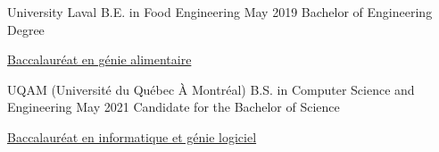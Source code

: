 

\begin{cventries}

  \cventry
    {University Laval} %
    {B.E. in Food Engineering } %
    {May 2019} %
    {Bachelor of Engineering Degree} %
    {
      \begin{cvitems} %
      \item{\href{https://www.ulaval.ca/les-etudes/programmes/repertoire/details/baccalaureat-en-genie-alimentaire-b-ing.html}
                {Baccalauréat en génie alimentaire}}
      \end{cvitems}
    }

  \cventry
    {UQAM (Université du Québec À Montréal)} %
    {B.S. in Computer Science and Engineering} %
    {May 2021} %
    {Candidate for the Bachelor of Science} %
    {
      \begin{cvitems} %
      \item{\href{https://etudier.uqam.ca/programme?code=7416}
           {Baccalauréat en informatique et génie logiciel}}
      \end{cvitems}
    }

\end{cventries}
